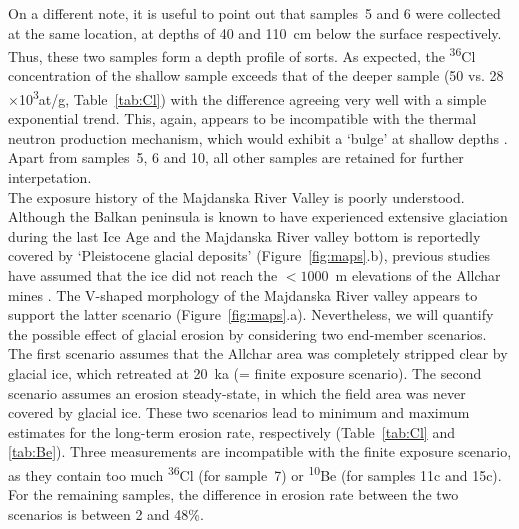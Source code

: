 \documentclass[titlepage]{article}
\begin{document}
On a different note, it is useful to point out that samples~5 and 6
were collected at the same location, at depths of 40 and 110~cm below
the surface respectively. Thus, these two samples form a depth profile
of sorts. As expected, the \textsuperscript{36}Cl concentration of the
shallow sample exceeds that of the deeper sample (50
vs. 28$\times$10\textsuperscript{3}at/g, Table~\ref{tab:Cl}) with the
difference agreeing very well with a simple exponential trend. This,
again, appears to be incompatible with the thermal neutron production
mechanism, which would exhibit a `bulge' at shallow depths
\citep{schimmelpfennig2009}. Apart from samples~5, 6 and 10, all other
samples are retained for further interpetation.\\

The exposure history of the Majdanska River Valley is poorly
understood.  Although the Balkan peninsula is known to have
experienced extensive glaciation during the last Ice Age
\citep{menkovic2004} and the Majdanska River valley bottom is
reportedly covered by `Pleistocene glacial deposits'
(Figure~\ref{fig:maps}.b), previous studies have assumed that the ice
did not reach the $< 1000$~m elevations of the Allchar mines
\citep{pavicevic2016}. The V-shaped morphology of the Majdanska River
valley appears to support the latter scenario
(Figure~\ref{fig:maps}.a). Nevertheless, we will quantify the possible
effect of glacial erosion by considering two end-member scenarios.\\

The first scenario assumes that the Allchar area was completely
stripped clear by glacial ice, which retreated at 20~ka (= finite
exposure scenario). The second scenario assumes an erosion
steady-state, in which the field area was never covered by glacial
ice. These two scenarios lead to minimum and maximum estimates for the
long-term erosion rate, respectively (Table~\ref{tab:Cl} and
\ref{tab:Be}).  Three measurements are incompatible with the finite
exposure scenario, as they contain too much \textsuperscript{36}Cl
(for sample~7) or \textsuperscript{10}Be (for samples 11c and
15c). For the remaining samples, the difference in erosion rate
between the two scenarios is between 2 and 48\%.
\end{document}
